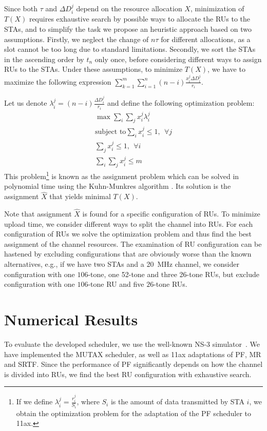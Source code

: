 Since both $\tau$ and  $\Delta D_i^j$ depend on the resource allocation $X$, minimization of $T(X)$ requires exhaustive search by possible ways to allocate the RUs to the STAs, and to simplify the task we propose an heuristic approach based on two assumptions.
Firstly, we neglect the change of $n \tau$ for different allocations, as a slot cannot be too long due to standard limitations.
Secondly, we sort the STAs in the ascending order by $t_n$ only once, before considering different ways to assign RUs to the STAs.
Under these assumptions, to minimize  $T(X)$, we have to maximize the following expression $\sum_{k = 1}^{m} \sum_{i = 1}^{n } \left(n - i\right) \frac{x_i^j \Delta D_i^j}{r_{i}}$.

Let us denote $\lambda_i^j = \left(n - i\right) \frac{\Delta D_i^j}{r_{i}}$ and define the following optimization problem:
\begin{align}
\max \sum_{i} \sum_{j} x_i^j \lambda_i^j \\
\text{subject to} \sum_{i} x_i^j \leq 1,\ \  \forall j \\
\sum_{j} x_i^j \leq 1, \ \ \forall i \\
\sum_{i} \sum_{j} x_i^j \leq m
\end{align}
This problem\footnote{If we define $\lambda_i^j = \frac{r_i^j}{S_i}$, where $S_i$ is the amount of data transmitted by STA $i$, we obtain the optimization problem for the adaptation of the PF scheduler to 11ax.} is known as the assignment problem which can be solved in polynomial time using the Kuhn-Munkres algorithm \cite{bourgeois1971extension}.
Its solution is the assignment $\hat X$ that yields minimal $T(X)$.

Note that assignment $\hat X$ is found for a specific configuration of RUs.
To minimize upload time, we consider different ways to split the channel into RUs. For each configuration of RUs we solve the optimization problem and thus find the best assignment of the channel resources.
The examination of RU configuration can be hastened by excluding configurations that are obviously worse than the known alternatives, e.g., if we have two STAs and a \SI{20}{\MHz} channel, we consider configuration with one $106$-tone, one 52-tone and three 26-tone RUs, but exclude configuration with one $106$-tone RU and five $26$-tone RUs.

\section{Numerical  Results}
\label{numerical}
To evaluate the developed scheduler, we use  the well-known NS-3 simulator~\cite{ns-3}.
We have implemented the MUTAX scheduler, as well as 11ax adaptations of PF, MR and SRTF.
Since the performance of PF significantly depends on how the channel is divided into RUs, we find the best RU configuration with exhaustive search.

